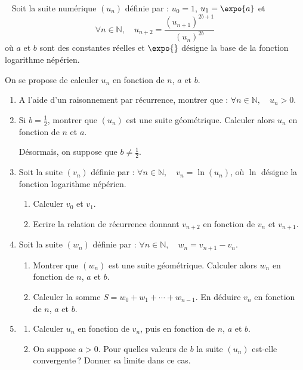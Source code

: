 %
\begin{exo}\label{exo:suite-8}~\newline
      Soit la suite num\'erique $(u_n)$ d\'efinie par : 
      $u_0 = 1$, $u_1 = \expo{a}$ et $$ \forall n \in \mathbb{N}, \quad u_{n+2} = \frac{(u_{n+1})^{2b+1}}{(u_n)^{2b}} $$
      o\`u $a$ et $b$ sont des constantes r\'eelles et $\expo{}$ d\'esigne la base de la fonction logarithme n\'ep\'erien.
      
      On se propose de calculer $u_n$ en fonction de $n$, $a$ et $b$.
      \begin{enumerate}
            \item A l'aide d'un raisonnement par r\'ecurrence, montrer que : $\forall n \in \mathbb{N}, \quad u_n > 0$.
            \item Si $b=\frac{1}{2}$, montrer que $(u_n)$ est une suite g\'eom\'etrique.
                  Calculer alors $u_n$ en fonction de $n$ et $a$.
                  
                  D\'esormais, on suppose que $b \neq \frac{1}{2}$.
            \item Soit la suite $(v_n)$ d\'efinie par : $\forall n \in \mathbb{N}, \quad v_n = \ln (u_n)$,
                  o\`u $\ln$ d\'esigne la fonction logarithme n\'ep\'erien.
                  \begin{enumerate}
                        \item Calculer $v_0$ et $v_1$.
                        \item Ecrire la relation de r\'ecurrence donnant $v_{n+2}$ en fonction de $v_n$ et $v_{n+1}$.
                  \end{enumerate}
            \item Soit la suite $(w_n)$ d\'efinie par : $\forall n \in \mathbb{N}, \quad w_n = v_{n+1} - v_n$.
                  \begin{enumerate}
                        \item Montrer que $(w_n)$ est une suite g\'eom\'etrique.
                              Calculer alors $w_n$ en fonction de $n$, $a$ et $b$.
                        \item Calculer la somme $S = w_0 + w_1 + \cdots + w_{n-1}$.
                              En d\'eduire $v_n$ en fonction de $n$, $a$ et $b$.
                  \end{enumerate}
            \item \begin{enumerate}
                        \item Calculer $u_n$ en fonction de $v_n$, puis en fonction de $n$, $a$ et $b$.
                        \item On suppose $a > 0$. Pour quelles valeurs de $b$ la suite $(u_n)$ est-elle convergente\,?
                              Donner sa limite dans ce cas.
                  \end{enumerate}
      \end{enumerate}
\end{exo}
